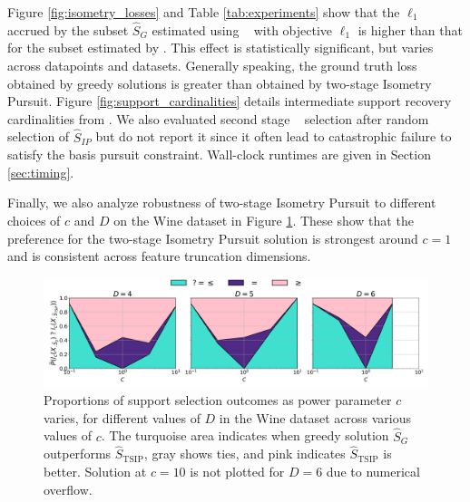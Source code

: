 Figure \ref{fig:isometry_losses} and Table \ref{tab:experiments} show that the $\ell_1$ accrued by the subset $\widehat S_{G}$ estimated using \greedy~ with objective $\ell_1$ is higher than that for the subset estimated by \tsip.
This effect is statistically significant, but varies across datapoints and datasets.
Generally speaking, the ground truth loss obtained by greedy solutions is greater than obtained by two-stage Isometry Pursuit.
Figure \ref{fig:support_cardinalities} details intermediate support recovery cardinalities from \isometrypursuit.
We also evaluated second stage \brute~ selection after random selection of $\widehat S_{IP}$ but do not report it since it often lead to catastrophic failure to satisfy the basis pursuit constraint.
Wall-clock runtimes are given in Section \ref{sec:timing}.

Finally, we also analyze robustness of two-stage Isometry Pursuit to different choices of $c$ and $D$ on the Wine dataset in Figure \ref{fig:stacked_power_comparison}.
These show that the preference for the two-stage Isometry Pursuit solution is strongest around $c=1$ and is consistent across feature truncation dimensions.

\clearpage

\begin{figure}[t!]
    \centering
    \includegraphics[width=\textwidth]{../figures/grid_power_comparison_filled.png}
    \caption{
        Proportions of support selection outcomes as power parameter $c$ varies, for different values of $D$ in the Wine dataset across various values of $c$.
        The turquoise area indicates when greedy solution  $\widehat{S}_G$ outperforms $\widehat{S}_{\text{TSIP}}$, gray shows ties, and pink indicates $\widehat{S}_{\text{TSIP}}$ is better.
        Solution at $c=10$ is not plotted for $D=6$ due to numerical overflow.
    }
    \label{fig:stacked_power_comparison}
\end{figure}



